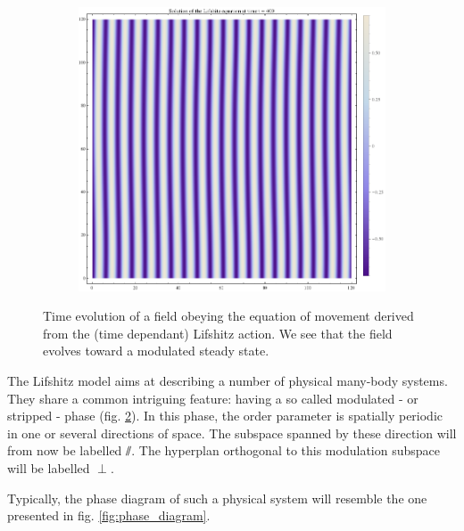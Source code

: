 \begin{figure}[htp]
\begin{subfigure}{.33\textwidth}
	\centering
	\includegraphics[width=.9\linewidth]{img/chap1/sol_Lif_t400.png}
	\caption{}
	\label{}
\end{subfigure}
\caption{Time evolution of a field obeying the equation of movement derived from the (time dependant) Lifshitz action. We see that the field evolves toward a modulated steady state.}
\label{fig:evol_strip}
\end{figure}

The Lifshitz model aims at describing a number of physical many-body systems. They share a common intriguing feature: having a so called modulated - or stripped - phase (fig. \ref{fig:evol_strip}). In this phase, the order parameter is spatially periodic in one or several directions of space. The subspace spanned by these direction will from now be labelled $\sslash$. The hyperplan orthogonal to this modulation subspace will be labelled $\perp$.

Typically, the phase diagram of such a physical system will resemble the one presented in fig. \ref{fig:phase_diagram}.

